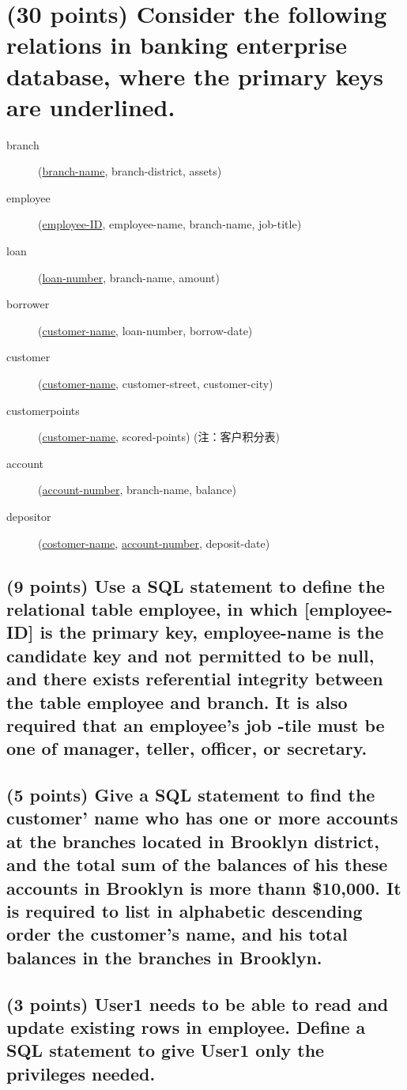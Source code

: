 \documentclass{ctexart}
\begin{document}
\section{(30 points) Consider the following relations in banking enterprise database, where the primary keys are underlined.}
\begin{description}
    \item[branch] (\underline{branch-name}, branch-district, assets)
    \item[employee] (\underline{employee-ID}, employee-name, branch-name, job-title)
    \item[loan] (\underline{loan-number}, branch-name, amount)
    \item[borrower] (\underline{customer-name}, loan-number, borrow-date)
    \item[customer] (\underline{customer-name}, customer-street, customer-city)
    \item[customerpoints] (\underline{customer-name}, scored-points) (注：客户积分表)
    \item[account] (\underline{account-number}, branch-name, balance)
    \item[depositor] (\underline{costomer-name}, \underline{account-number}, deposit-date) 
\end{description}\par
\subsection{(9 points) Use a SQL statement to define the relational table employee, in which [employee-ID] is the primary key, {employee-name} is the candidate key and not permitted to be null, and there exists referential integrity between the table employee and branch. It is also required that an employee's job -tile must be one of manager, teller, officer, or secretary.}
\subsection{(5 points) Give a SQL statement to find the customer' name who has one or more accounts at the branches located in Brooklyn district, and the total sum of the balances of his these accounts in Brooklyn is more thann \$10,000. It is required to list in alphabetic descending order the customer's name, and his total balances in the branches in Brooklyn.}
\subsection{(3 points) User1 needs to be able to read and update existing rows in employee. Define a SQL statement to give User1 only the privileges needed.}
\end{document}
